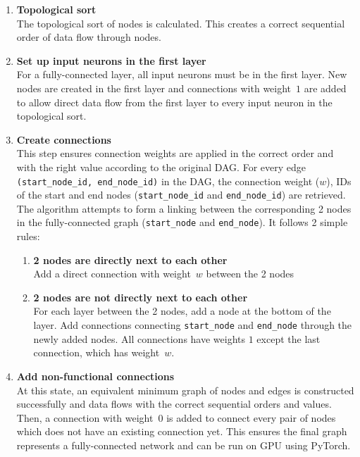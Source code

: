 \documentclass{article}
\begin{document}
\begin{enumerate}
    \item \textbf{Topological sort} \\
    The topological sort of nodes is calculated. This creates a correct sequential order of data flow through nodes. 

    \item \textbf{Set up input neurons in the first layer} \\
    For a fully-connected layer, all input neurons must be in the first layer. New nodes are created in the first layer and connections with weight~$1$ are added to allow direct data flow from the first layer to every input neuron in the topological sort. 

    \item \textbf{Create connections} \\
    This step ensures connection weights are applied in the correct order and with the right value according to the original DAG. For every edge \texttt{(start\_node\_id, end\_node\_id)} in the DAG, the connection weight ($w$), IDs of the start and end nodes (\texttt{start\_node\_id} and \texttt{end\_node\_id}) are retrieved. The algorithm attempts to form a linking between the corresponding 2 nodes in the fully-connected graph (\texttt{start\_node} and \texttt{end\_node}). It follows 2 simple rules: 
    
    \begin{enumerate}
        \item \textbf{2 nodes are directly next to each other} \\
        Add a direct connection with weight~$w$ between the 2 nodes

        \item \textbf{2 nodes are not directly next to each other} \\
        For each layer between the 2 nodes, add a node at the bottom of the layer. Add connections connecting \texttt{start\_node} and \texttt{end\_node} through the newly added nodes. All connections have weights $1$ except the last connection, which has weight~$w$. 
    \end{enumerate}

    \item \textbf{Add non-functional connections} \\
    At this state, an equivalent minimum graph of nodes and edges is constructed successfully and data flows with the correct sequential orders and values. Then, a connection with weight~$0$ is added to connect every pair of nodes which does not have an existing connection yet. This ensures the final graph represents a fully-connected network and can be run on GPU using PyTorch. 


\end{enumerate}
\end{document}
